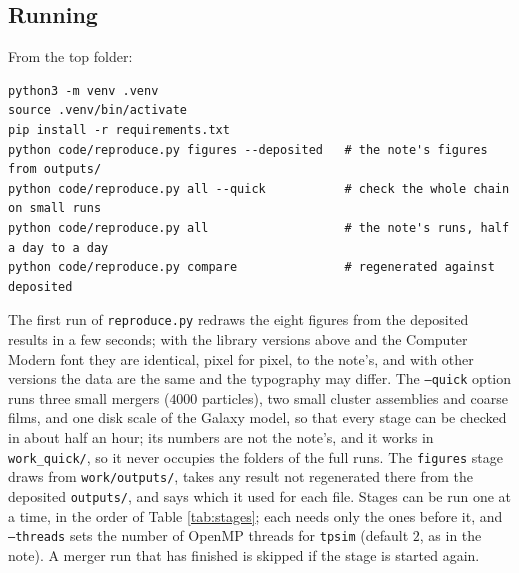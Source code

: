 \documentclass[11pt]{article}
\theoremstyle{definition}
\newcommand{\file}[1]{\texttt{#1}}
\begin{document}
\subsection{Running}

From the top folder:
{\small\begin{verbatim}
python3 -m venv .venv
source .venv/bin/activate
pip install -r requirements.txt
python code/reproduce.py figures --deposited   # the note's figures from outputs/
python code/reproduce.py all --quick           # check the whole chain on small runs
python code/reproduce.py all                   # the note's runs, half a day to a day
python code/reproduce.py compare               # regenerated against deposited
\end{verbatim}}
The first run of \file{reproduce.py} redraws the eight figures from the deposited results in a few seconds; with the library versions above and the Computer Modern font they are identical, pixel for pixel, to the note's, and with other versions the data are the same and the typography may differ. The \texttt{--quick} option runs three small mergers ($4000$ particles), two small cluster assemblies and coarse films, and one disk scale of the Galaxy model, so that every stage can be checked in about half an hour; its numbers are not the note's, and it works in \file{work\_quick/}, so it never occupies the folders of the full runs. The \texttt{figures} stage draws from \file{work/outputs/}, takes any result not regenerated there from the deposited \file{outputs/}, and says which it used for each file. Stages can be run one at a time, in the order of Table \ref{tab:stages}; each needs only the ones before it, and \texttt{--threads} sets the number of OpenMP threads for \file{tpsim} (default $2$, as in the note). A merger run that has finished is skipped if the stage is started again.
\end{document}
